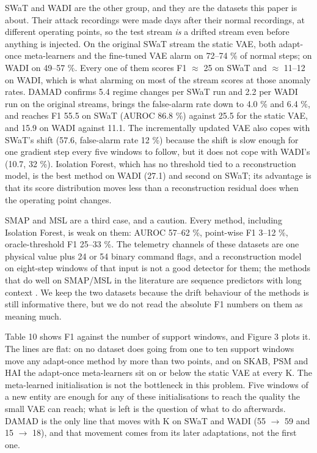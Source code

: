 SWaT and WADI are the other group, and they are the datasets this paper is about. Their attack recordings were made days after their normal recordings, at different operating points, so the test stream \emph{is} a drifted stream even before anything is injected. On the original SWaT stream the static VAE, both adapt-once meta-learners and the fine-tuned VAE alarm on 72--74 \% of normal steps; on WADI on 49--57 \%. Every one of them scores F1 \ensuremath{\approx} 25 on SWaT and \ensuremath{\approx} 11--12 on WADI, which is what alarming on most of the stream scores at those anomaly rates. DAMAD confirms 5.4 regime changes per SWaT run and 2.2 per WADI run on the original streams, brings the false-alarm rate down to 4.0 \% and 6.4 \%, and reaches F1 55.5 on SWaT (AUROC 86.8 \%) against 25.5 for the static VAE, and 15.9 on WADI against 11.1. The incrementally updated VAE also copes with SWaT's shift (57.6, false-alarm rate 12 \%) because the shift is slow enough for one gradient step every five windows to follow, but it does not cope with WADI's (10.7, 32 \%). Isolation Forest, which has no threshold tied to a reconstruction model, is the best method on WADI (27.1) and second on SWaT; its advantage is that its score distribution moves less than a reconstruction residual does when the operating point changes.

SMAP and MSL are a third case, and a caution. Every method, including Isolation Forest, is weak on them: AUROC 57--62 \%, point-wise F1 3--12 \%, oracle-threshold F1 25--33 \%. The telemetry channels of these datasets are one physical value plus 24 or 54 binary command flags, and a reconstruction model on eight-step windows of that input is not a good detector for them; the methods that do well on SMAP/MSL in the literature are sequence predictors with long context \citep{hundman2018smap}. We keep the two datasets because the drift behaviour of the methods is still informative there, but we do not read the absolute F1 numbers on them as meaning much.

Table 10 shows F1 against the number of support windows, and Figure 3 plots it. The lines are flat: on no dataset does going from one to ten support windows move any adapt-once method by more than two points, and on SKAB, PSM and HAI the adapt-once meta-learners sit on or below the static VAE at every K. The meta-learned initialisation is not the bottleneck in this problem. Five windows of a new entity are enough for any of these initialisations to reach the quality the small VAE can reach; what is left is the question of what to do afterwards. DAMAD is the only line that moves with K on SWaT and WADI (55 \ensuremath{\rightarrow} 59 and 15 \ensuremath{\rightarrow} 18), and that movement comes from its later adaptations, not the first one.


